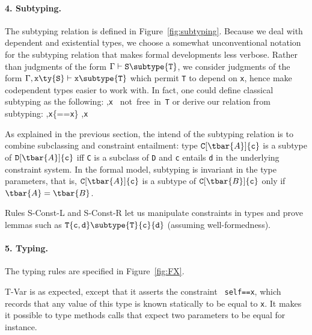 \paragraph{4. Subtyping.} The subtyping relation is defined in Figure~\ref{fig:subtyping}.
Because we deal with dependent and existential types, we choose a somewhat unconventional notation for the subtyping relation that makes formal developments less verbose. Rather than judgments of the form $\Gamma\vdash{\tt S}\subtype{\tt T}$, we consider judgments of the form $\Gamma,{\tt x}\ty{\tt S}\vdash{\tt x}\subtype{\tt T}$ which permit {\tt T} to depend on {\tt x}, hence make codependent types easier to work with. In fact, one could define classical subtyping as the following:
\infrule
	{ \andalso \Gamma,{\tt x} ~\rm not~free~in~{\tt T}}
	{\Gamma{}}
or derive our relation from subtyping:
\infrule
	{\Gamma,{\tt x}\{\self=={\tt x}\}}
	{\Gamma,{\tt x}}

As explained in the previous section, the intend of the subtyping relation is to combine subclassing and constraint entailment: type ${\tt C}[\tbar{A}]\{{\tt c}\}$ is a subtype of ${\tt D}[\tbar{A}]\{{\tt c}\}$ iff {\tt C} is a subclass of {\tt D} and {\tt c} entails {\tt d} in the underlying constraint system. In the formal model, subtyping is invariant in the type parameters, that is, ${\tt C}[\tbar{A}]\{{\tt c}\}$ is a subtype of ${\tt C}[\tbar{B}]\{{\tt c}\}$ only if $\tbar{A}=\tbar{B}$.

Rules {\sc S-Const-L} and {\sc S-Const-R} let us manipulate constraints in types and prove lemmas such as ${\tt T}\{{\tt c},{\tt d}\}\subtype {\tt T}\{{\tt c}\}\{{\tt d}\}$ (assuming well-formedness).


\paragraph{5. Typing.} The typing rules are specified in Figure~\ref{fig:FX}.

{\sc T-Var} is as expected, except that it asserts the constraint {\tt
self==x}, which records that any value of this type is known
statically to be equal to {\tt x}. It makes it possible to type methods
calls that expect two parameters to be equal for instance.


